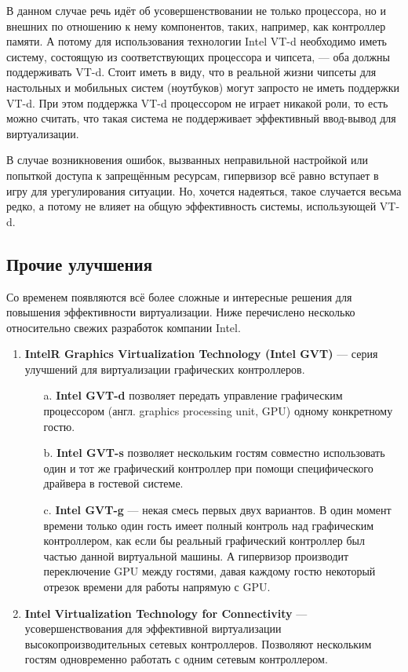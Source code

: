 \documentclass[14pt, a4paper]{article}
\begin{document}
В данном случае речь идёт об усовершенствовании не только процессора, но и внешних по
отношению к нему компонентов, таких, например, как контроллер памяти. А потому для
использования технологии Intel VT-d необходимо иметь систему, состоящую из соответствующих
процессора и чипсета, — оба должны поддерживать VT-d. Стоит иметь в виду, что в реальной жизни
чипсеты для настольных и мобильных систем (ноутбуков) могут запросто не иметь поддержки VT-d.
При этом поддержка VT-d процессором не играет никакой роли, то есть можно считать, что такая
система не поддерживает эффективный ввод-вывод для виртуализации.

В случае возникновения ошибок, вызванных неправильной настройкой или попыткой доступа к
запрещённым ресурсам, гипервизор всё равно вступает в игру для урегулирования ситуации. Но,
хочется надеяться, такое случается весьма редко, а потому не влияет на общую эффективность
системы, использующей VT-d.\\

\subsection*{\textbf{Прочие улучшения}}

Со временем появляются всё более сложные и интересные решения для повышения эффективности
виртуализации. Ниже перечислено несколько относительно свежих разработок компании Intel.

\begin{enumerate}
    \item \textbf{IntelR Graphics Virtualization Technology (Intel GVT)} — серия улучшений для виртуализации
    графических контроллеров.
    \begin{enumerate}
        \item[a.] \textbf{Intel GVT-d} позволяет передать управление графическим процессором (англ. graphics
        processing unit, GPU) одному конкретному гостю.
        \item[b.] \textbf{Intel GVT-s} позволяет нескольким гостям совместно использовать один и тот же
        графический контроллер при помощи специфического драйвера в гостевой системе.
        \item[c.] \textbf{Intel GVT-g} — некая смесь первых двух вариантов. В один момент времени только
        один гость имеет полный контроль над графическим контроллером, как если бы
        реальный графический контроллер был частью данной виртуальной машины. А
        гипервизор производит переключение GPU между гостями, давая каждому гостю
        некоторый отрезок времени для работы напрямую с GPU.
    \end{enumerate}
    \item \textbf{Intel Virtualization Technology for Connectivity} — усовершенствования для эффективной
    виртуализации высокопроизводительных сетевых контроллеров. Позволяют нескольким
    гостям одновременно работать с одним сетевым контроллером.
\end{enumerate}
\end{document}

